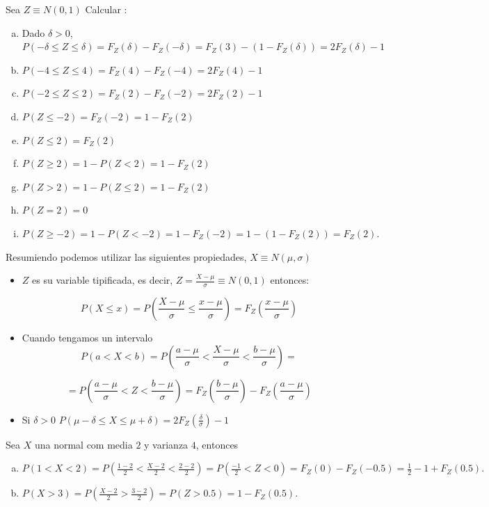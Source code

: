 \begin{example} Sea $Z\equiv N(0,1)$  Calcular :
\begin{enumerate}[a)]
\item Dado $\delta>0$, $P(-\delta\leq Z \leq
\delta)=F_{Z}(\delta)-F_{Z}(-\delta)=F_Z(3)-(1-F_Z(\delta))=2 F_Z(\delta)-1$
\item $P(-4\leq Z \leq 4)=F_{Z}(4)-F_{Z}(-4)=2 F_Z(4)-1$
\item $P(-2\leq Z \leq 2)=F_{Z}(2)-F_{Z}(-2)=2 F_Z(2)-1$
\item $P(Z\leq -2)=F_Z(-2)=1-F_Z(2)$
\item $P( Z \leq 2)=F_{Z}(2)$
\item $P( Z \geq 2)=1-P(Z<2)=1-F_{Z}(2)$
\item $P( Z > 2)=1-P(Z\leq 2)=1-F_{Z}(2)$
\item $P( Z = 2)=0$
\item $P( Z \geq -2)=1-P(Z< -2)=1-F_{Z}(-2)=1-(1-F_Z(2))=F_Z(2).$
\end{enumerate}
\end{example}
    Resumiendo podemos utilizar las siguientes propiedades, $X\equiv N(\mu,\sigma)$
    \begin{itemize}
    \item  $Z$ es su variable tipificada, es decir,
    $Z=\frac{X-\mu}{\sigma}\equiv N(0,1)$ entonces:

    $$P(X\leq x)=P(\frac{X-\mu}{\sigma}\leq
    \frac{x-\mu}{\sigma})=F_{Z}(\frac{x-\mu}{\sigma})$$

   \item  Cuando tengamos un intervalo
    $$P(a<X<b)=P(\frac{a-\mu}{\sigma}<\frac{X-\mu}{\sigma}<\frac{b-\mu}{\sigma})=$$

    $$=P(\frac{a-\mu}{\sigma}<Z<\frac{b-\mu}{\sigma})=F_{Z}(\frac{b-\mu}{\sigma})-
    F_{Z}(\frac{a-\mu}{\sigma})$$
    \item Si $\delta>0$ $P(\mu-\delta\leq X \leq
\mu+\delta)=2 F_Z(\frac{\delta}{\sigma})-1$
\end{itemize}


    \begin{example}Sea $X$ una normal com media $2$ y varianza $4$, entonces
    \begin{enumerate}[a)]
\item  $P(1< X< 2)= P(\frac{1-2}{2}<\frac{X-2}{2}<\frac{2-2}{2})=
    P(\frac{-1}{2}<Z<0)=F_{Z}(0)-F_{Z}(-0.5)=\frac{1}{2}-1+F_{Z}(0.5).$
    \item $P(X>3)=P(\frac{X-2}{2}>\frac{3-2}{2})=
    P(Z>0.5)=1-F_{Z}(0.5).$
    \end{enumerate}
\end{example}
